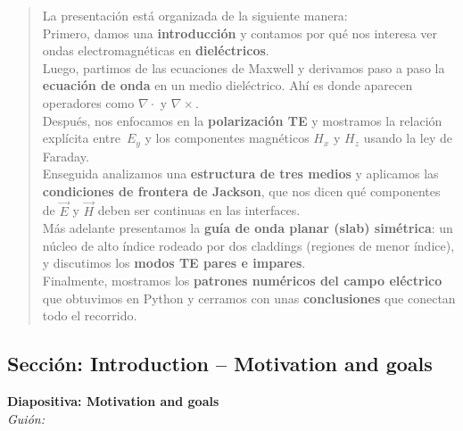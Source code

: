 \documentclass{article}
\begin{document}
\begin{quote}
La presentación está organizada de la siguiente manera:\\[2mm]
Primero, damos una \textbf{introducción} y contamos por qué nos interesa ver ondas electromagnéticas en 
\textbf{dieléctricos}.\\
Luego, partimos de las \textcolor{Apple Green}{ecuaciones de Maxwell} y derivamos paso a paso la 
\textbf{ecuación de onda} en un medio dieléctrico. Ahí es donde aparecen operadores como 
\(\nabla\cdot\) y \(\nabla\times\).\\
Después, nos enfocamos en la \textbf{polarización TE} y mostramos la relación explícita entre 
\(\,E_y\) y los componentes magnéticos \(H_x\) y \(H_z\) usando la ley de Faraday.\\
Enseguida analizamos una \textbf{estructura de tres medios} y aplicamos las 
\textbf{condiciones de frontera de Jackson}, que nos dicen qué componentes de \(\vec{E}\) y \(\vec{H}\) 
deben ser continuas en las interfaces.\\
Más adelante presentamos la \textbf{guía de onda planar (slab) simétrica}: un núcleo de alto índice 
rodeado por dos \textcolor{Tarawera}{claddings} (regiones de menor índice), y discutimos los 
\textbf{modos TE pares e impares}.\\
Finalmente, mostramos los \textbf{patrones numéricos del campo eléctrico} que obtuvimos en Python 
y cerramos con unas \textbf{conclusiones} que conectan todo el recorrido.
\end{quote}

\vspace{0.8cm}

\subsection*{Sección: Introduction -- Motivation and goals}

\noindent
\textbf{Diapositiva: Motivation and goals}\\[2mm]
\textit{Guión:}\\[2mm]
\end{document}
